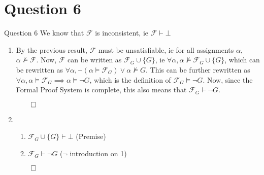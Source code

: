 \documentclass{beamer}
\begin{document}
    \section{Question 6}
    {
        \begin{frame}{Question 6}
            We know that $\mathcal{F}$ is inconsistent, ie $\mathcal{F} \vdash \bot$
            \begin{enumerate}
                \item By the previous result, $\mathcal{F}$ must be unsatisfiable, ie for all assignments $\alpha$, $\alpha \nvDash \mathcal{F}$. Now, $\mathcal{F}$ can be written as $\mathcal{F}_{G} \cup \{G\}$, ie $\forall \alpha, \alpha \nvDash \mathcal{F}_{G} \cup \{G\}$, which can be rewritten as $\forall \alpha, \neg (\alpha \models \mathcal{F}_{G}) \lor \alpha \nvDash G$. This can be further rewritten as $\forall \alpha, \alpha \models \mathcal{F}_{G} \implies \alpha \models \neg G$, which is the definition of $\mathcal{F}_{G} \models \neg G$. Now, since the Formal Proof System is complete, this also means that $\mathcal{F}_{G} \vdash \neg G$.
                
                $\qed$
                \item \begin{enumerate}
                    \item $\mathcal{F}_{G} \cup \{G\} \vdash \bot$ (Premise)
                    \item $\mathcal{F}_{G} \vdash \neg G$ ($\neg$ introduction on 1)
                \end{enumerate}
                $\qed$
            \end{enumerate}
        \end{frame}
    }
\end{document}
